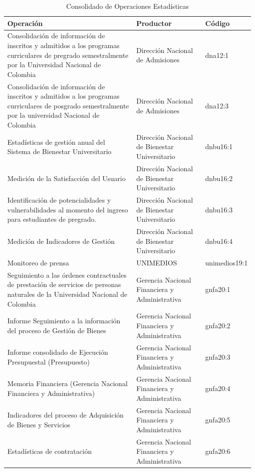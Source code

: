 \documentclass[
]{book}
\begin{document}
\begin{table}

\caption{\label{tab:unnamed-chunk-3}Consolidado de Operaciones Estadísticas}
\centering
\begin{tabular}[t]{l|l|l}
\hline
Operación & Productor & Código\\
\hline
Consolidación de información de inscritos y admitidos a los programas curriculares de pregrado semestralmente por la Universidad Nacional de Colombia & Dirección Nacional de Admisiones & dna12:1\\
\hline
Consolidación de información de inscritos y admitidos a los programas curriculares de posgrado semestralmente por la universidad Nacional de Colombia & Dirección Nacional de Admisiones & dna12:3\\
\hline
Estadísticas de gestión anual del Sistema de Bienestar Universitario & Dirección Nacional de Bienestar Universitario & dnbu16:1\\
\hline
Medición de la Satisfacción del Usuario & Dirección Nacional de Bienestar Universitario & dnbu16:2\\
\hline
Identificación de potencialidades y vulnerabilidades al momento del ingreso para estudiantes de pregrado. & Dirección Nacional de Bienestar Universitario & dnbu16:3\\
\hline
Medición de Indicadores de Gestión & Dirección Nacional de Bienestar Universitario & dnbu16:4\\
\hline
Monitoreo de prensa & UNIMEDIOS & unimedios19:1\\
\hline
Seguimiento a las órdenes contractuales de prestación de servicios de personas naturales de la Universidad Nacional de Colombia & Gerencia Nacional Financiera y Administrativa & gnfa20:1\\
\hline
Informe Seguimiento a la información del proceso de Gestión de Bienes & Gerencia Nacional Financiera y Administrativa & gnfa20:2\\
\hline
Informe consolidado de Ejecución Presupuestal (Presupuesto) & Gerencia Nacional Financiera y Administrativa & gnfa20:3\\
\hline
Memoria Financiera (Gerencia Nacional Financiera y Administrativa) & Gerencia Nacional Financiera y Administrativa & gnfa20:4\\
\hline
Indicadores del proceso de Adquisición de Bienes y Servicios & Gerencia Nacional Financiera y Administrativa & gnfa20:5\\
\hline
Estadísticas de contratación & Gerencia Nacional Financiera y Administrativa & gnfa20:6\\

\end{tabular}
\end{table}
\end{document}
